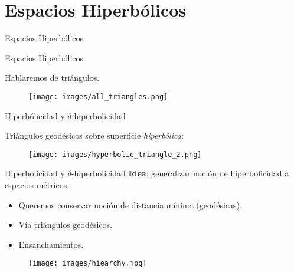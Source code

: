 \documentclass[xcolor=dvipsnames]{beamer}
\theoremstyle{largebreak}
\begin{document}
\section{Espacios Hiperbólicos}

\begin{frame}{Espacios Hiperbólicos}
    \begin{center}
        \LARGE{Espacios Hiperbólicos}
    \end{center}

    \pause

    \begin{center}
        Hablaremos de triángulos.
    \end{center}
    \begin{figure}
        \begin{center}
            \texttt{[image: images/all\_triangles.png]}
        \end{center}
    \end{figure}

\end{frame}

\begin{frame}{Hiperbólicidad y $\delta$-hiperbolicidad}
    \begin{center}
        Triángulos geodésicos sobre superficie \textit{hiperbólica}:
    \end{center}
    \begin{figure}
        \begin{center}
            \texttt{[image: images/hyperbolic\_triangle\_2.png]}
        \end{center}
    \end{figure}
\end{frame}

\begin{frame}{Hiperbólicidad y $\delta$-hiperbolicidad}
    \textbf{Idea}: generalizar noción de hiperbolicidad a espacios métricos.
    \begin{itemize}
        \item Queremos conservar noción de distancia mínima (geodésicas).
        \item Vía triángulos geodésicos.
        \item Ensanchamientos.
    \end{itemize}

    \pause
    \begin{figure}
        \begin{center}
            \texttt{[image: images/hiearchy.jpg]}
        \end{center}
    \end{figure}
\end{frame}
\end{document}
